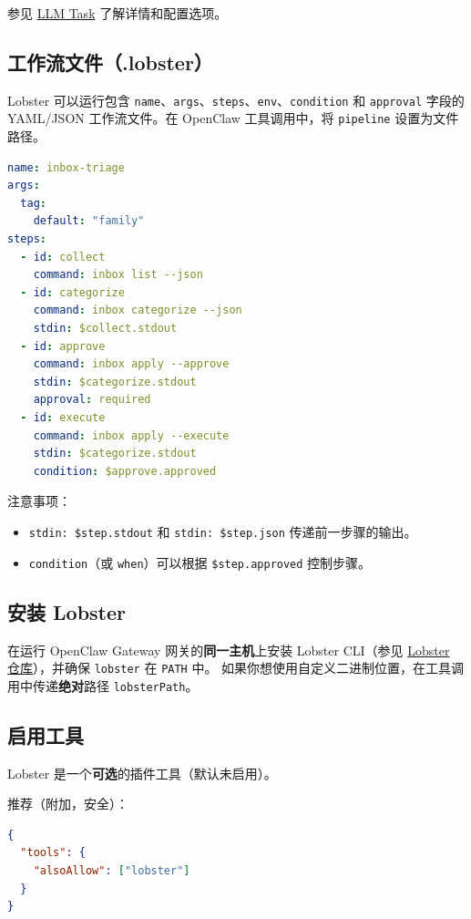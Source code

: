 参见 \href{/tools/llm-task}{LLM Task} 了解详情和配置选项。

\subsection{工作流文件（.lobster）}


Lobster 可以运行包含 \texttt{name}、\texttt{args}、\texttt{steps}、\texttt{env}、\texttt{condition} 和 \texttt{approval} 字段的 YAML/JSON 工作流文件。在 OpenClaw 工具调用中，将 \texttt{pipeline} 设置为文件路径。

\begin{lstlisting}[language=yaml]
name: inbox-triage
args:
  tag:
    default: "family"
steps:
  - id: collect
    command: inbox list --json
  - id: categorize
    command: inbox categorize --json
    stdin: $collect.stdout
  - id: approve
    command: inbox apply --approve
    stdin: $categorize.stdout
    approval: required
  - id: execute
    command: inbox apply --execute
    stdin: $categorize.stdout
    condition: $approve.approved
\end{lstlisting}


注意事项：

\begin{itemize}
  \item \texttt{stdin: \$step.stdout} 和 \texttt{stdin: \$step.json} 传递前一步骤的输出。
  \item \texttt{condition}（或 \texttt{when}）可以根据 \texttt{\$step.approved} 控制步骤。
\end{itemize}


\subsection{安装 Lobster}


在运行 OpenClaw Gateway 网关的\textbf{同一主机}上安装 Lobster CLI（参见 \href{https://github.com/openclaw/lobster}{Lobster 仓库}），并确保 \texttt{lobster} 在 \texttt{PATH} 中。
如果你想使用自定义二进制位置，在工具调用中传递\textbf{绝对}路径 \texttt{lobsterPath}。

\subsection{启用工具}


Lobster 是一个\textbf{可选}的插件工具（默认未启用）。

推荐（附加，安全）：

\begin{lstlisting}[language=json]
{
  "tools": {
    "alsoAllow": ["lobster"]
  }
}
\end{lstlisting}


